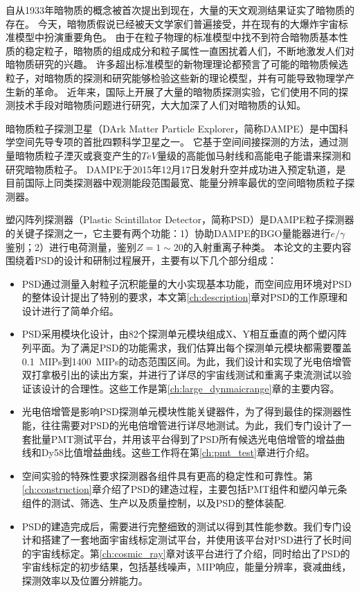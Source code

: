 
\begin{cabstract}
自从1933年暗物质的概念被首次提出到现在，大量的天文观测结果证实了暗物质的存在。
今天，暗物质假说已经被天文学家们普遍接受，并在现有的大爆炸宇宙标准模型中扮演重要角色。
由于在粒子物理的标准模型中找不到符合暗物质基本性质的稳定粒子，暗物质的组成成分和粒子属性一直困扰着人们，不断地激发人们对暗物质研究的兴趣。
许多超出标准模型的新物理理论都预言了可能的暗物质候选粒子，对暗物质的探测和研究能够检验这些新的理论模型，并有可能导致物理学产生新的革命。
近年来，国际上开展了大量的暗物质探测实验，它们使用不同的探测技术手段对暗物质问题进行研究，大大加深了人们对暗物质的认知。

暗物质粒子探测卫星（DArk Matter Particle Explorer，简称DAMPE）是中国科学空间先导专项的首批四颗科学卫星之一。
它基于空间间接探测的方法，通过测量暗物质粒子湮灭或衰变产生的$TeV$量级的高能伽马射线和高能电子能谱来探测和研究暗物质粒子。
DAMPE于2015年12月17日发射升空并成功进入预定轨道，是目前国际上同类探测器中观测能段范围最宽、能量分辨率最优的空间暗物质粒子探测器。

塑闪阵列探测器（Plastic Scintillator Detector，简称PSD）是DAMPE粒子探测器的关键子探测之一，它主要有两个功能：1）协助DAMPE的BGO量能器进行$e/\gamma$鉴别；2）进行电荷测量，鉴别$Z=1\sim 20$的入射重离子种类。
本论文的主要内容围绕着PSD的设计和研制过程展开，主要有以下几个部分组成：
\begin{itemize}
  \item PSD通过测量入射粒子沉积能量的大小实现基本功能，而空间应用环境对PSD的整体设计提出了特别的要求，本文第\ref{ch:description}章对PSD的工作原理和设计进行了简单介绍。
  \item PSD采用模块化设计，由82个探测单元模块组成X、Y相互垂直的两个塑闪阵列平面。为了满足PSD的功能需求，我们估算出每个探测单元模块都需要覆盖\SI{0.1}{MIPs}到\SI{1400}{MIPs}的动态范围区间。为此，我们设计和实现了光电倍增管双打拿极引出的读出方案，并进行了详尽的宇宙线测试和重离子束流测试以验证该设计的合理性。这些工作是第\ref{ch:large_dynmaicrange}章的主要内容。
  \item 光电倍增管是影响PSD探测单元模块性能关键器件，为了得到最佳的探测器性能，往往需要对PSD的光电倍增管进行详尽地测试。为此，我们专门设计了一套批量PMT测试平台，并用该平台得到了PSD所有候选光电倍增管的增益曲线和Dy58比值增益曲线。这些工作将在第\ref{ch:pmt_test}章进行介绍。
  \item 空间实验的特殊性要求探测器各组件具有更高的稳定性和可靠性。第\ref{ch:construction}章介绍了PSD的建造过程，主要包括PMT组件和塑闪单元条组件的测试、筛选、生产以及质量控制，以及PSD的整体装配.
  \item PSD的建造完成后，需要进行完整细致的测试以得到其性能参数。我们专门设计和搭建了一套地面宇宙线标定测试平台，并使用该平台对PSD进行了长时间的宇宙线标定。第\ref{ch:cosmic_ray}章对该平台进行了介绍，同时给出了PSD的宇宙线标定的初步结果，包括基线噪声，MIP响应，能量分辨率，衰减曲线，探测效率以及位置分辨能力。
\end{itemize}


\end{cabstract}

